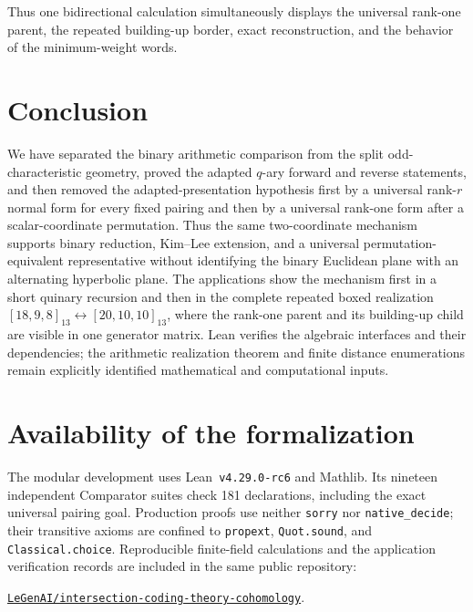 \documentclass[12pt]{article}
\begin{document}
Thus one bidirectional calculation simultaneously displays the universal
rank-one parent, the repeated building-up border, exact reconstruction, and
the behavior of the minimum-weight words.
\section{Conclusion}
\label{sec:conclusion}

We have separated the binary arithmetic comparison from the split
odd-characteristic geometry, proved the adapted \(q\)-ary forward and reverse
statements, and then removed the adapted-presentation hypothesis first by a
universal rank-\(r\) normal form for every fixed pairing and then by a
universal rank-one form after a scalar-coordinate permutation.  Thus the same two-coordinate mechanism
supports binary reduction, Kim--Lee extension, and a universal
permutation-equivalent representative without identifying the binary
Euclidean plane with an alternating hyperbolic plane.  The applications show
the mechanism first in a short quinary recursion and then in the complete
repeated boxed realization
\([18,9,8]_{13}\leftrightarrow[20,10,10]_{13}\), where the rank-one parent
and its building-up child are visible in one generator matrix.  Lean verifies
the algebraic interfaces and their dependencies; the arithmetic realization
theorem and finite distance enumerations remain explicitly identified
mathematical and computational inputs.


\section*{Availability of the formalization}

The modular development uses Lean~\texttt{v4.29.0-rc6} and Mathlib.  Its
nineteen independent Comparator suites check 181 declarations, including
the exact universal pairing goal.  Production proofs use neither
\texttt{sorry} nor \texttt{native\_decide}; their transitive axioms are
confined to \texttt{propext}, \texttt{Quot.sound}, and
\texttt{Classical.choice}.  Reproducible finite-field calculations and the
application verification records are included in the same public repository:
\begin{center}
\href{https://github.com/LeGenAI/intersection-coding-theory-cohomology}
{\texttt{LeGenAI/intersection-coding-theory-cohomology}}.
\end{center}
\end{document}

